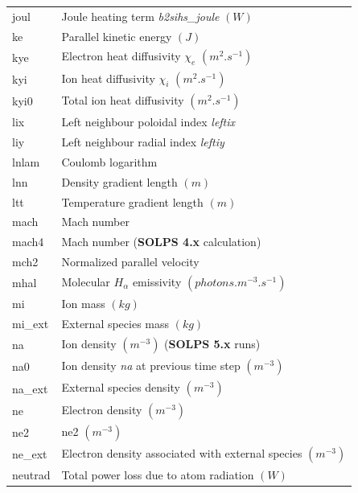 \documentclass[a4paper,10pt]{report}
\newcommand\SOLPSfour{{\bf SOLPS 4.x} }
\newcommand\SOLPSfive{{\bf SOLPS 5.x} }
\begin{document}
\begin{center}
\begin{longtable}{|l|l|}
    joul     & \index{b2plot, joul} Joule heating term {\em b2sihs\_joule} $(W)$ \\
    ke       & \index{b2plot, ke} Parallel kinetic energy $(J)$ \\
    kye      & \index{b2plot, kye} Electron heat diffusivity $\chi_e$ $(m^2.s^{-1})$ \\
    kyi      & \index{b2plot, kyi} Ion heat diffusivity $\chi_i$ $(m^2.s^{-1})$ \\
    kyi0     & \index{b2plot, kyi0} Total ion heat diffusivity $(m^2.s^{-1})$ \\
    lix      & \index{b2plot, lix} Left neighbour poloidal index {\em leftix} \\
    liy      & \index{b2plot, liy} Left neighbour radial index {\em leftiy} \\
    lnlam    & \index{b2plot, lnlam} Coulomb logarithm \\
    lnn      & \index{b2plot, lnn} Density gradient length $(m)$ \\
    ltt      & \index{b2plot, ltt} Temperature gradient length $(m)$ \\
    mach     & \index{b2plot, mach} Mach number \\
    mach4    & \index{b2plot, mach4} Mach number (\SOLPSfour calculation) \\
    mch2     & \index{b2plot, mch2} Normalized parallel velocity \\
    mhal     & \index{b2plot, mhal} Molecular $H_\alpha$ emissivity $(photons.m^{-3}.s^{-1})$ \\
    mi       & \index{b2plot, mi} Ion mass $(kg)$ \\
    mi\_ext  & \index{b2plot, mi\_ext} External species mass $(kg)$ \\
    na       & \index{b2plot, na} Ion density $(m^{-3})$ (\SOLPSfive runs) \\
    na0      & \index{b2plot, na0} Ion density {\em na} at previous time step $(m^{-3})$ \\
    na\_ext  & \index{b2plot, na\_ext} External species density $(m^{-3})$ \\
    ne       & \index{b2plot, ne} Electron density $(m^{-3})$ \\
    ne2      & \index{b2plot, ne2} ne2 $(m^{-3})$ \\
    ne\_ext  & \index{b2plot, ne\_ext} Electron density associated with external species $(m^{-3})$ \\
    neutrad  & \index{b2plot, neutrad} Total power loss due to atom radiation $(W)$ \\

\end{longtable}
\end{center}
\end{document}
